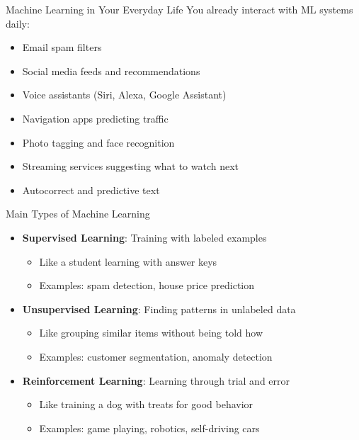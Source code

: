\documentclass{beamer}
\begin{document}
\begin{frame}{Machine Learning in Your Everyday Life}
  You already interact with ML systems daily:
  
  \begin{itemize}
    \item Email spam filters
    \item Social media feeds and recommendations
    \item Voice assistants (Siri, Alexa, Google Assistant)
    \item Navigation apps predicting traffic
    \item Photo tagging and face recognition
    \item Streaming services suggesting what to watch next
    \item Autocorrect and predictive text
  \end{itemize}
\end{frame}

\begin{frame}{Main Types of Machine Learning}
  \begin{itemize}
    \item \textbf{Supervised Learning}: Training with labeled examples
      \begin{itemize}
        \item Like a student learning with answer keys
        \item Examples: spam detection, house price prediction
      \end{itemize}
      
    \item \textbf{Unsupervised Learning}: Finding patterns in unlabeled data
      \begin{itemize}
        \item Like grouping similar items without being told how
        \item Examples: customer segmentation, anomaly detection
      \end{itemize}
      
    \item \textbf{Reinforcement Learning}: Learning through trial and error
      \begin{itemize}
        \item Like training a dog with treats for good behavior
        \item Examples: game playing, robotics, self-driving cars
      \end{itemize}
  \end{itemize}
\end{frame}
\end{document}
